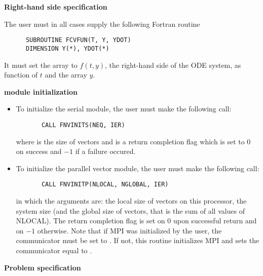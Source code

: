 \begin{Steps}
  
\item {\bf Right-hand side specification}
  
  The user must in all cases supply the following Fortran routine
\begin{verbatim}
      SUBROUTINE FCVFUN(T, Y, YDOT)
      DIMENSION Y(*), YDOT(*)
\end{verbatim}
  It must set the  array to $f(t,y)$, the right-hand side of the ODE
  system, as function of  $t$ and the array  $y$.  
  
\item  {\bf {\nvector} module initialization}

  \begin{itemize}
  \item {\s}
    To initialize the serial {\nvector} module, the user must make the following call:
\begin{verbatim}
       CALL FNVINITS(NEQ, IER)
\end{verbatim}
    where  is the size of vectors and
     is a  return completion flag which is set to $0$ on success and $-1$ 
    if a failure occured.
    
  \item {\p}
    To initialize the parallel vector module, the user must make the following call:
\begin{verbatim}
       CALL FNVINITP(NLOCAL, NGLOBAL, IER)
\end{verbatim}
    in which the arguments are:  the local size of vectors on this processor,
     the system size (and the global size of vectors, that is the sum 
    of all values of NLOCAL). The return completion flag  is set on $0$ upon
    successful return and on $-1$ otherwise.
    Note that if MPI was initialized by the user, the communicator must be
    set to .  If not, this routine initializes MPI and sets
    the communicator equal to .
  \end{itemize}
  
\item {\bf Problem specification}


\end{Steps}
